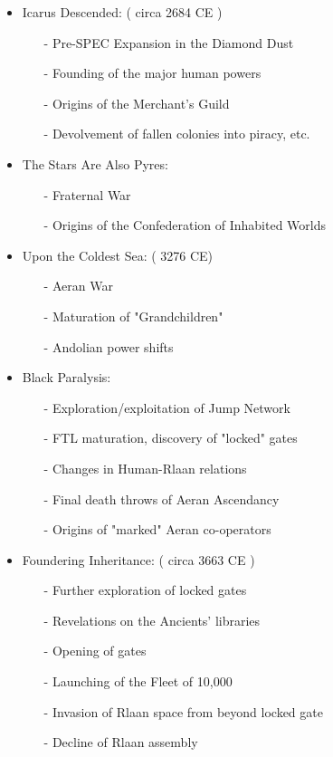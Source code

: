 \begin{itemize}
\item	Icarus Descended: ( circa 2684 CE )
\begin{itemize}
\item	[-] Pre-SPEC Expansion in the Diamond Dust
\item	[-] Founding of the major human powers
\item	[-] Origins of the Merchant's Guild
\item	[-] Devolvement of fallen colonies into piracy, etc.
\end{itemize}
\item	The Stars Are Also Pyres:
\begin{itemize}
\item	[-] Fraternal War
\item	[-] Origins of the Confederation of Inhabited Worlds
\end{itemize}
\item	Upon the Coldest Sea: ( 3276 CE)
\begin{itemize}
\item	[-] Aeran War
\item	[-] Maturation of "Grandchildren"
\item	[-] Andolian power shifts
\end{itemize}
\item	Black Paralysis:
\begin{itemize}
\item	[-] Exploration/exploitation of Jump Network
\item	[-] FTL maturation, discovery of "locked" gates
\item	[-] Changes in Human-Rlaan relations
\item	[-] Final death throws of Aeran Ascendancy
\item	[-] Origins of "marked" Aeran co-operators
\end{itemize}
\item	Foundering Inheritance: ( circa 3663 CE )
\begin{itemize}
\item	[-] Further exploration of locked gates
\item	[-] Revelations on the Ancients' libraries
\item	[-] Opening of gates
\item	[-] Launching of the Fleet of 10,000
\item	[-] Invasion of Rlaan space from beyond locked gate	
\item	[-] Decline of Rlaan assembly

\end{itemize}
\end{itemize}
